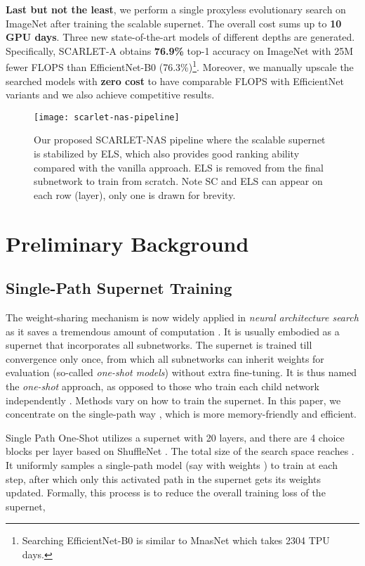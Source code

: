 \documentclass[10pt,twocolumn,letterpaper]{article}
\theoremstyle{definition}
\begin{document}
\textbf{Last but not the least}, we perform a single proxyless evolutionary search on ImageNet after training the scalable supernet. The overall cost sums up to \textbf{10 GPU days}. Three new state-of-the-art models of different depths are generated. Specifically, SCARLET-A obtains \textbf{76.9\%} top-1 accuracy on ImageNet with 25M fewer FLOPS than EfficientNet-B0 (76.3\%)\footnote{Searching EfficientNet-B0 is similar to MnasNet \cite{tan2018mnasnet} which takes 2304 TPU days.}. Moreover, we manually upscale the searched models with \textbf{zero cost} to have  comparable FLOPS with EfficientNet variants and we also achieve competitive results.

\begin{figure*}[ht]
	\centering
	\texttt{[image: scarlet-nas-pipeline]}
	\vskip -0.05in
	\caption{Our proposed SCARLET-NAS pipeline where the scalable supernet is stabilized by ELS, which also provides good ranking ability compared with the vanilla approach. ELS is removed from the final subnetwork to train from scratch. Note SC and ELS can appear on each row (layer), only one is drawn for brevity.}
	\label{fig:scarlet-nas-pipeline}
\end{figure*} 
 
\section{Preliminary Background}

\subsection{Single-Path Supernet Training}\label{sec:single}
The weight-sharing mechanism is now widely applied in \emph{neural architecture search} as it saves a tremendous amount of computation \cite{pham2018efficient,liu2018darts,bender2018understanding}. It is usually embodied as a supernet that incorporates all subnetworks. The supernet is trained till convergence only once, from which all subnetworks  can inherit weights for evaluation (so-called \emph{one-shot models}) without extra fine-tuning. It is thus named the \emph{one-shot} approach, as opposed to those who train each child network independently \cite{zoph2018learning,tan2018mnasnet}. Methods vary on how to train the supernet. In this paper, we concentrate on the single-path way \cite{guo2019single,chu2019fairnas}, which is more memory-friendly and efficient.

Single Path One-Shot \cite{guo2019single} utilizes a supernet  with 20 layers, and there are 4 choice blocks per layer based on ShuffleNet \cite{zhang2018shufflenet}. The total size of the search space reaches . It uniformly samples a single-path model (say  with weights ) to train at each step, after which only this activated path in the supernet gets its weights  updated. Formally, this process is to reduce the overall training loss  of the supernet,
\end{document}
